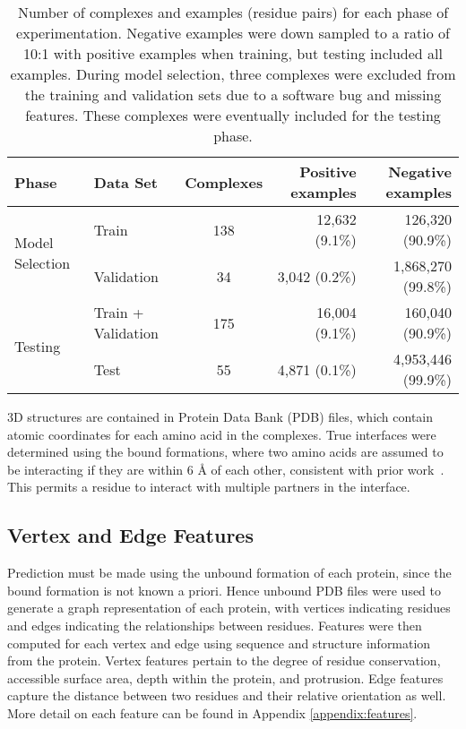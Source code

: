 \begin{table}
	\centering
	\begin{tabular}{l l c r r}
		\toprule
		Phase & Data Set & Complexes & Positive examples  & Negative examples \\ 
		\midrule
		\multirow{2}{*}{Model Selection} 
			& Train      & 138       & 12,632 (9.1\%)     & 126,320 (90.9\%) \\
			& Validation & 34        & 3,042 (0.2\%) 		& 1,868,270 (99.8\%) \\
		\midrule
		\multirow{2}{*}{Testing}
			& Train + Validation & 175 & 16,004 (9.1\%) & 160,040 (90.9\%) \\
			& Test       & 55        & 4,871 (0.1\%)      & 4,953,446 (99.9\%) \\ 
		\bottomrule
	\end{tabular}
	\caption{Number of complexes and examples (residue pairs) for each phase of experimentation. Negative examples were down sampled to a ratio of 10:1 with positive examples when training, but testing included all examples. During model selection, three complexes were excluded from the training and validation sets due to a software bug and missing features. These complexes were eventually included for the testing phase. \label{tab:dataset_size}}
	\label{tab:examples}
\end{table}

3D structures are contained in Protein Data Bank (PDB) files, which contain atomic coordinates for each amino acid in the complexes.
True interfaces were determined using the bound formations, where two amino acids are assumed to be interacting if they are within 6 \AA{} of each other, consistent with prior work~\cite{ofran2007, ahmad2011, minhas2014}.
This permits a residue to interact with multiple partners in the interface.

\subsection{Vertex and Edge Features}
Prediction must be made using the unbound formation of each protein, since the bound formation is not known a priori.
Hence unbound PDB files were used to generate a graph representation of each protein, with vertices indicating residues and edges indicating the relationships between residues.
Features were then computed for each vertex and edge using sequence and structure information from the protein.
Vertex features pertain to the degree of residue conservation, accessible surface area, depth within the protein, and protrusion.
Edge features capture the distance between two residues and their relative orientation as well.
More detail on each feature can be found in Appendix \ref{appendix:features}.

